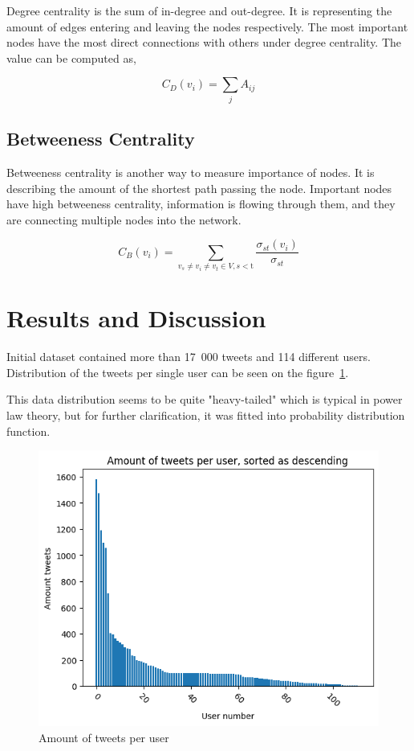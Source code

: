 \documentclass[conference]{IEEEtran}
\begin{document}
Degree centrality is the sum of in-degree and out-degree. 
It is representing the amount of edges entering and leaving the nodes respectively. 
The most important nodes have the most direct connections with others under degree centrality.
The value can be computed as,

\begin{equation*}\label{eq:degree-centrality}
    C_{D}(v_{i})={\sum}_{j}A_{ij} \tag{1} 
\end{equation*}

\subsection{Betweeness Centrality}

Betweeness centrality is another way to measure importance of nodes.
It is describing the amount of the shortest path passing the node.
Important nodes have high betweeness centrality, information is flowing through them, and they are connecting multiple nodes into the network.

\begin{equation*}
    C_{B}(v_{i})={\sum}_{v_{s}\neq v_{i}\neq v_{t}\in V,s < \text{t}}\frac{\sigma_{st}(v_{i})}{\sigma_{st}} \tag{2}
\end{equation*}

\section{Results and Discussion}\label{sec:results-and-discussion}

Initial dataset contained more than 17~000 tweets and 114 different users.
Distribution of the tweets per single user can be seen on the figure~\ref{fig:amount-tweets-user}.

This data distribution seems to be quite "heavy-tailed" which is typical in power law theory, but for further clarification, it was fitted into probability distribution function.


\begin{figure}
    \includegraphics[scale=0.6]{figures/amount_tweets_per_user}
     \caption{Amount of tweets per user}
    \label{fig:amount-tweets-user}
\end{figure}
\end{document}
